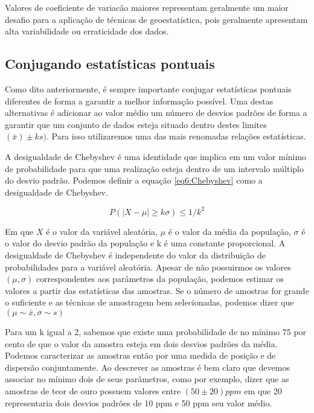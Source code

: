Valores de coeficiente de variacão maiores representam geralmente um maior desafio para a aplicação de técnicas de geoestatística, pois geralmente apresentam alta variabilidade ou erraticidade dos dados.

\subsection{Conjugando estatísticas pontuais}

Como dito anteriormente, é sempre importante conjugar estatísticas pontuais diferentes de forma a garantir a melhor informação possível. Uma destas alternativas é adicionar ao valor médio um número de desvios padrões de forma a garantir que um conjunto de dados esteja situado dentro destes limites $(\bar{x}) \pm k s)$. Para isso utilizaremos uma das mais renomadas relações estatísticas.
	
	A desigualdade de Chebyshev é uma identidade que implica em um valor mínimo de probabilidade para que uma realização esteja dentro de um intervalo múltiplo do desvio padrão. Podemos definir a equação \eqref{eq6:Chebyshev} como a desigualdade de Chebyshev.
	
	\begin{equation}\label{eq6:Chebyshev}
	P\left(|X-\mu| \geq k\sigma\right)\leq1/k^2
	\end{equation}
	
	Em que $X$ é o valor da variável aleatória, $\mu$ é o valor da média da população, $\sigma$ é o valor do desvio padrão da população e k é uma constante proporcional. A desigualdade de Chebyshev é independente do valor da distribuição de probabilidades para a variável aleatória. Apesar de não possuirmos os valores $(\mu, \sigma)$ correspondentes aos parâmetros da população, podemos estimar os valores a partir das estatísticas das amostras. Se o número de amostras for grande o suficiente e as técnicas de amostragem bem selecionadas,  podemos dizer que $(\mu \sim \bar{x}, \sigma \sim s)$ 

Para um k igual a 2, sabemos que existe uma probabilidade de no mínimo 75 por cento de que o valor da amostra esteja em dois desvios padrões da média. Podemos caracterizar as amostras então por uma medida de posição e de dispersão conjuntamente. Ao descrever as amostras é bem claro que devemos associar no mínimo dois de seus parâmetros, como por exemplo, dizer que as amostras de teor de ouro possuem valores entre $\left(50 \pm 20 \right) ppm$ em que 20 representaria dois desvios padrões de 10 ppm e 50 ppm seu valor médio.
		


